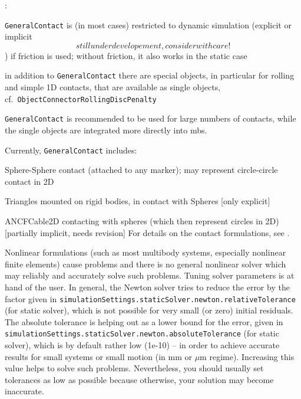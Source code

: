 \noindent {}:
\bi
\item \texttt{GeneralContact} is (in most cases) restricted to dynamic simulation (explicit or implicit \[still under developement, consider with care!\]) if friction is used; without friction, it also works in the static case
\item in addition to \texttt{GeneralContact} there are special objects, in particular for rolling and simple 1D contacts, that are available as single objects, cf.\ \texttt{ObjectConnectorRollingDiscPenalty}
\item \texttt{GeneralContact} is recommended to be used for large numbers of contacts, while the single objects are integrated more directly into mbs.
\ei

\noindent Currently, \texttt{GeneralContact} includes:
\bi
  \item Sphere-Sphere contact (attached to any marker); may represent circle-circle contact in 2D
  \item Triangles mounted on rigid bodies, in contact with Spheres [only explicit]
  \item ANCFCable2D contacting with spheres (which then represent circles in 2D) [partially implicit, needs revision]
\ei
For details on the contact formulations, see .

\label{secConvergenceProblems}
Nonlinear formulations (such as most multibody systems, especially nonlinear finite elements) cause problems and there is no general nonlinear solver which may reliably and accurately solve such problems.
Tuning solver parameters is at hand of the user. 
In general, the Newton solver tries to reduce the error by the factor given in \texttt{simulationSettings.staticSolver.newton.relativeTolerance} (for static solver), which is not possible for very small (or zero) initial residuals. The absolute tolerance is helping out as a lower bound for the error, given in \texttt{simulationSettings.staticSolver.newton.absoluteTolerance} (for static solver), which is by default rather low (1e-10) -- in order to achieve accurate results for small systems or small motion (in mm or $\mu$m regime). Increasing this value helps to solve such problems. Nevertheless, you should usually set tolerances as low as possible because otherwise, your solution may become inaccurate.

